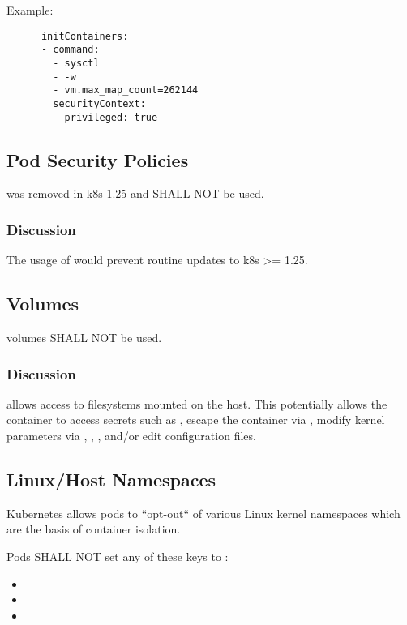 \documentclass[PMO,authoryear,toc]{lsstdoc}
\begin{document}
Example:

\begin{verbatim}
      initContainers:
      - command:
        - sysctl
        - -w
        - vm.max_map_count=262144
        securityContext:
          privileged: true
\end{verbatim}

\subsection{Pod Security Policies}

 was removed in k8s 1.25 and SHALL NOT be used.

\subsubsection{Discussion}

The usage of  would prevent routine updates to k8s >= 1.25.

\subsection{ Volumes}

 volumes SHALL NOT be used.

\subsubsection{Discussion}

 allows access to filesystems mounted on the host. This potentially allows the container to access secrets such as , escape the container via , modify kernel parameters via , , , and/or edit configuration files.

\subsection{Linux/Host Namespaces}

Kubernetes allows pods to ``opt-out`` of various Linux kernel namespaces which are the basis of container isolation.

Pods SHALL NOT set any of these  keys to :

\begin{itemize}
  \item {}
  \item {}
  \item {}
\end{itemize}
\end{document}
